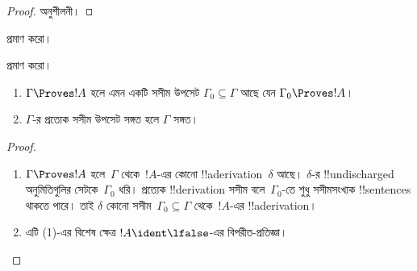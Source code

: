\documentclass[../../../include/open-logic-section]{subfiles}
\begin{document}
\begin{proof}
অনুশীলনী।
\end{proof}

\begin{prob}
 প্রমাণ করো।
\end{prob}
\tagendprob

\begin{prob}
 প্রমাণ করো।
\end{prob}
\tagendprob

\begin{prop}[সংহতি]
  \begin{enumerate}
  \item $\Gamma \Proves !A$ হলে এমন একটি সসীম উপসেট $\Gamma_0
    \subseteq \Gamma$ আছে যেন $\Gamma_0 \Proves !A$।
  \item $\Gamma$-র প্রত্যেক সসীম উপসেট সঙ্গত হলে $\Gamma$ সঙ্গত।
  \end{enumerate}
\end{prop}

\begin{proof}
  \begin{enumerate}
    \item $\Gamma \Proves !A$ হলে~$\Gamma$ থেকে~$!A$-এর কোনো
      !!a{derivation}~$\delta$ আছে। $\delta$-র !!{undischarged}
      অনুমিতিগুলির সেটকে~$\Gamma_0$ ধরি। প্রত্যেক !!{derivation}
      সসীম বলে~$\Gamma_0$-তে শুধু সসীমসংখ্যক !!{sentence}s থাকতে পারে।
      তাই $\delta$ কোনো সসীম~$\Gamma_0 \subseteq \Gamma$ থেকে~$!A$-এর
      !!a{derivation}।
    \item এটি (1)-এর বিশেষ ক্ষেত্র $!A \ident \lfalse$-এর
      বিপরীত-প্রতিজ্ঞা।
  \end{enumerate}
\end{proof}
\end{document}
